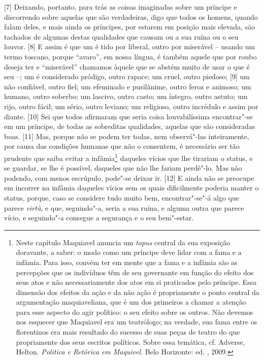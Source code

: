 {[}7{]} Deixando, portanto, para trás as coisas imaginadas sobre um
príncipe e discorrendo sobre aquelas que são verdadeiras, digo que todos
os homens, quando falam deles, e mais ainda os príncipes, por estarem em
posição mais elevada, são tachados de algumas destas qualidades que
causam ou a sua ruína ou o seu louvor. {[}8{]} E assim é que um é tido
por liberal, outro por miserável -- usando um termo toscano, porque
``avaro'', em nossa língua, é também aquele que por roubo deseja ter e
``miserável'' chamamos àquele que se abstém muito de usar o que é seu
--; um é considerado pródigo, outro rapace; um cruel, outro piedoso;
{[}9{]} um não confiável, outro fiel; um efeminado e pusilânime, outro
feroz e animoso; um humano, outro soberbo; um lascivo, outro casto; um
íntegro, outro astuto; um rijo, outro fácil; um sério, outro leviano; um
religioso, outro incrédulo e assim por diante. {[}10{]} Sei que todos
afirmaram que seria coisa louvabilíssima encontrar"-se em um príncipe,
de todas as sobreditas qualidades, aquelas que são consideradas boas.
{[}11{]} Mas, porque não se podem ter todas, nem observá"-las
inteiramente, por causa das condições humanas que não o consentem, é
necessário ser tão prudente que saiba evitar a infâmia\footnote{Neste
  capítulo Maquiavel anuncia um \emph{topus} central da sua exposição
  doravante, a saber: o modo como um príncipe deve lidar com a fama e a
  infâmia. Para isso, convém ter em mente que a fama e a infâmia são as
  percepções que os indivíduos têm de seu governante em função do efeito
  dos seus atos e não necessariamente dos atos em si praticados pelo
  príncipe. Essa dimensão dos efeitos da ação e da não ação é
  propriamente o ponto central da argumentação maquiaveliana, que é um
  dos primeiros a chamar a atenção para esse aspecto do agir político: o
  seu efeito sobre os outros. Não devemos nos esquecer que Maquiavel era
  um teatrólogo; na verdade, sua fama entre os florentinos era mais
  resultado do sucesso de suas peças de teatro do que propriamente dos
  seus escritos políticos. Sobre essa temática, cf. Adverse, Helton.
  \emph{Politica e Retórica em Maquivel}. Belo Horizonte: ed. ,
  2009.} daqueles vícios que lhe tirariam o status, e se guardar, se lhe
é possível, daqueles que não lhe fariam perdê"-lo. Mas não podendo, com
menos escrúpulo, pode"-se deixar ir. {[}12{]} E ainda não se preocupe em
incorrer na infâmia daqueles vícios sem os quais dificilmente poderia
manter o status, porque, caso se considere tudo muito bem,
encontrar"-se"-á algo que parece \emph{virtù}, e que, seguindo"-a, seria a
sua ruína, e alguma outra que parece vício, e seguindo"-a consegue a
segurança e o seu bem"-estar.

